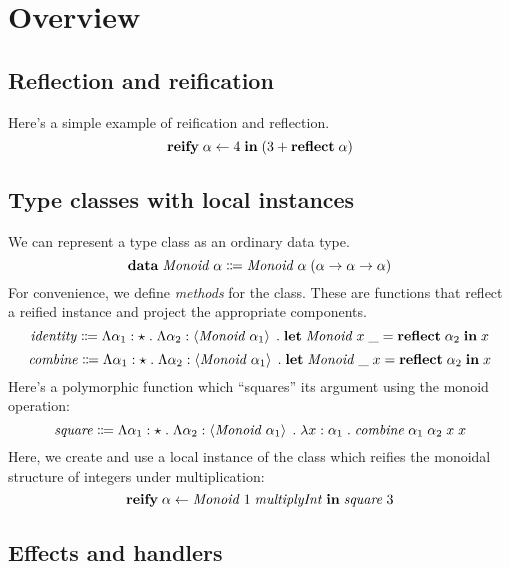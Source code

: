 \section{Overview}

  \subsection{Reflection and reification}

    Here's a simple example of reification and reflection.
    \[ \mathbf{reify} \; \alpha \leftarrow 4 \; \mathbf{in} \; \mathopen{}\left( 3 + \mathbf{reflect} \; \alpha \right)\mathclose{} \]

  \subsection{Type classes with local instances}

    We can represent a type class as an ordinary data type.
    \[ \mathbf{data} \; \mathit{Monoid} \; \alpha \Coloneqq \mathit{Monoid} \; \alpha \; \mathopen{}\left( \alpha \rightarrow \alpha \rightarrow \alpha \right)\mathclose{} \]
    For convenience, we define \emph{methods} for the class. These are functions that reflect a reified instance and project the appropriate components.
    \[ \mathit{identity} \Coloneqq \Lambda \alpha_1 : \star \; . \; \Lambda \alpha_2 : \left\langle \mathit{Monoid} \; \alpha_1 \right\rangle \; . \; \mathbf{let} \; \mathit{Monoid} \; x \; \_ = \mathbf{reflect} \; \alpha_2 \; \mathbf{in} \; x \]
    \[ \mathit{combine} \Coloneqq \Lambda \alpha_1 : \star \; . \; \Lambda \alpha_2 : \left\langle \mathit{Monoid} \; \alpha_1 \right\rangle \; . \; \mathbf{let} \; \mathit{Monoid} \; \_ \; x = \mathbf{reflect} \; \alpha_2 \; \mathbf{in} \; x \]
    Here's a polymorphic function which ``squares'' its argument using the monoid operation:
    \[ \mathit{square} \Coloneqq \Lambda \alpha_1 : \star \; . \; \Lambda \alpha_2 : \left\langle \mathit{Monoid} \; \alpha_1 \right\rangle \; . \; \lambda x : \alpha_1 \; . \; \mathit{combine} \; \alpha_1 \; \alpha_2 \; x \; x \]
    Here, we create and use a local instance of the class which reifies the monoidal structure of integers under multiplication:
    \[ \mathbf{reify} \; \alpha \leftarrow \mathit{Monoid} \; 1 \; \mathit{multiplyInt} \; \mathbf{in} \; \mathit{square} \; 3 \]

  \subsection{Effects and handlers}
